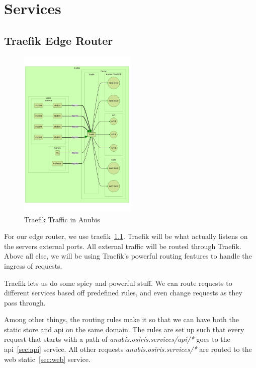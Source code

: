 \chapter{Services}\label{ch:services}


\section{Traefik Edge Router}\label{sec:traefik}

\begin{figure}[ht]
    \centering
    \includegraphics[width=0.5\textwidth]{figures/traefik.mmd.png}
    \caption{Traefik Traffic in Anubis\label{fig:traefik}}
\end{figure}

For our edge router, we use traefik~\ref{fig:traefik}.
Traefik will be what actually listens on the servers external ports.
All external traffic will be routed through Traefik.
Above all else, we will be using Traefik's powerful routing features to handle the ingress of requests.

Traefik lets us do some spicy and powerful stuff.
We can route requests to different services based off predefined rules,
and even change requests as they pass through.

Among other things, the routing rules make it so that we can have
both the static store and api on the same domain.
The rules are set up such that every request that
starts with a path of \textit{anubis.osiris.services/api/*} goes to the api~\ref{sec:api} service.
All other requests \textit{anubis.osiris.services/*} are routed to the web static~\ref{sec:web} service.

